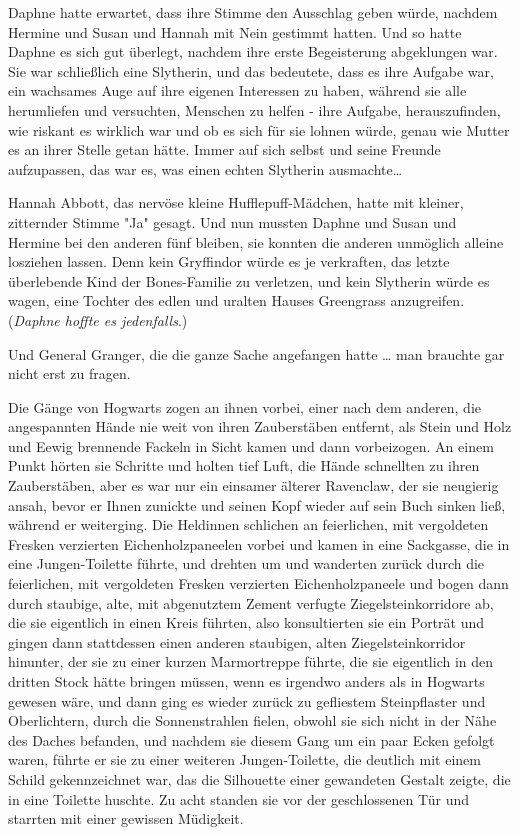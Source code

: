 {Daphne hatte erwartet, dass ihre Stimme den Ausschlag geben würde, nachdem Hermine und Susan und Hannah mit Nein gestimmt hatten. Und so hatte Daphne es sich gut überlegt, nachdem ihre erste Begeisterung abgeklungen war. Sie war schließlich eine Slytherin, und das bedeutete, dass es ihre Aufgabe war, ein wachsames Auge auf ihre eigenen Interessen zu haben, während sie alle herumliefen und versuchten, Menschen zu helfen - ihre Aufgabe, herauszufinden, wie riskant es wirklich war und ob es sich für sie lohnen würde, genau wie Mutter es an ihrer Stelle getan hätte. Immer auf sich selbst und seine Freunde aufzupassen, das war es, was einen echten Slytherin ausmachte…

Hannah Abbott, das nervöse kleine Hufflepuff-Mädchen, hatte mit kleiner, zitternder Stimme "Ja" gesagt. Und nun mussten Daphne und Susan und Hermine bei den anderen fünf bleiben, sie konnten die anderen unmöglich alleine losziehen lassen. Denn kein Gryffindor würde es je verkraften, das letzte überlebende Kind der Bones-Familie zu verletzen, und kein Slytherin würde es wagen, eine Tochter des edlen und uralten Hauses Greengrass anzugreifen. (\emph{Daphne hoffte es jedenfalls}.)

Und General Granger, die die ganze Sache angefangen hatte … man brauchte gar nicht erst zu fragen.

Die Gänge von Hogwarts zogen an ihnen vorbei, einer nach dem anderen, die angespannten Hände nie weit von ihren Zauberstäben entfernt, als Stein und Holz und Eewig brennende Fackeln in Sicht kamen und dann vorbeizogen. An einem Punkt hörten sie Schritte und holten tief Luft, die Hände schnellten zu ihren Zauberstäben, aber es war nur ein einsamer älterer Ravenclaw, der sie neugierig ansah, bevor er Ihnen zunickte und seinen Kopf wieder auf sein Buch sinken ließ, während er weiterging. Die Heldinnen schlichen an feierlichen, mit vergoldeten Fresken verzierten Eichenholzpaneelen vorbei und kamen in eine Sackgasse, die in eine Jungen-Toilette führte, und drehten um und wanderten zurück durch die feierlichen, mit vergoldeten Fresken verzierten Eichenholzpaneele und bogen dann durch staubige, alte, mit abgenutztem Zement verfugte Ziegelsteinkorridore ab, die sie eigentlich in einen Kreis führten, also konsultierten sie ein Porträt und gingen dann stattdessen einen anderen staubigen, alten Ziegelsteinkorridor hinunter, der sie zu einer kurzen Marmortreppe führte, die sie eigentlich in den dritten Stock hätte bringen müssen, wenn es irgendwo anders als in Hogwarts gewesen wäre, und dann ging es wieder zurück zu gefliestem Steinpflaster und Oberlichtern, durch die Sonnenstrahlen fielen, obwohl sie sich nicht in der Nähe des Daches befanden, und nachdem sie diesem Gang um ein paar Ecken gefolgt waren, führte er sie zu einer weiteren Jungen-Toilette, die deutlich mit einem Schild gekennzeichnet war, das die Silhouette einer gewandeten Gestalt zeigte, die in eine Toilette huschte. Zu acht standen sie vor der geschlossenen Tür und starrten mit einer gewissen Müdigkeit.

}
